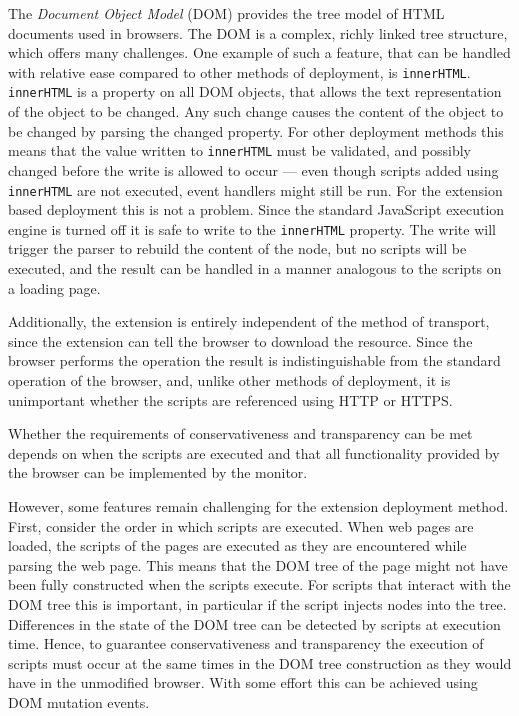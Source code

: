 \documentclass{llncs}
\begin{document}
The \emph{Document Object Model} (DOM) provides the tree model of HTML
documents used in browsers. The DOM is a complex, richly linked tree structure,
which offers many challenges.  One example of such a feature, that can be
handled with relative ease compared to other methods of deployment, is
\lstinline{innerHTML}. \lstinline{innerHTML} is a property on all DOM objects,
that allows the text representation of the object to be changed. Any such
change causes the content of the object to be changed by parsing the changed
property. For other deployment methods this means that the value written to
\lstinline{innerHTML} must be validated, and possibly changed before the write
is allowed to occur --- even though scripts added using \lstinline{innerHTML}
are not executed, event handlers might still be run.
%
For the extension based deployment this is not a problem.  Since the standard
JavaScript execution engine is turned off it is safe to write to the
\lstinline{innerHTML} property. The write will trigger the parser to rebuild
the content of the node, but no scripts will be executed, and the result can be
handled in a manner analogous to the scripts on a loading page.

Additionally, the extension is entirely independent of the method of transport,
since the extension can tell the browser to download the resource. Since the 
browser performs the operation the result
is indistinguishable from the standard operation of the browser, and, unlike other 
methods of deployment, it is unimportant whether the scripts
are referenced using HTTP or HTTPS.

Whether the requirements of conservativeness and transparency can be met
depends on when the scripts are executed and that all functionality provided by
the browser can be implemented by the monitor.

However, some features remain challenging for the extension deployment method.
First, consider the order in which scripts are executed.  When web pages are
loaded, the scripts of the pages are executed as they are encountered while
parsing the web page. This means that the DOM tree of the page might not have
been fully constructed when the scripts execute.  For scripts that interact
with the DOM tree this is important, in particular if the script injects nodes
into the tree. Differences in the state of the DOM tree can be detected by 
scripts at execution time. Hence, to guarantee conservativeness and transparency 
the execution of scripts must occur at the same times in the DOM tree construction
as they would have in the unmodified browser. With some effort this can be achieved
using DOM mutation events.
\end{document}
